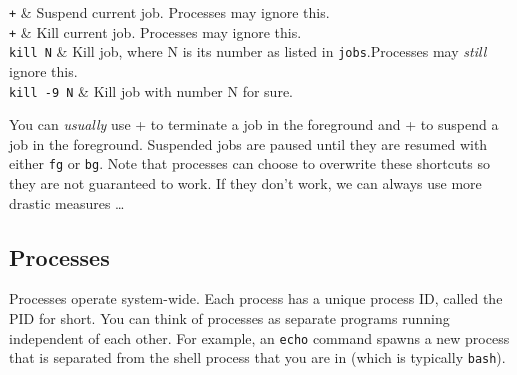\documentclass{TheAlternativeCourse}
\begin{document}
\begin{table}[H]
    \centering
    \begin{tcolorbox}[%
        enhanced,
        fuzzy shadow={1mm}{-1mm}{0mm}{0.1mm}{black!50!white},
        width=1.0\linewidth,
        tabularx={>{\centering\arraybackslash}l|>{\centering\arraybackslash}X},
        title={Controlling jobs}]
		\texttt{\keys{\ctrl}+} & Suspend current job. Processes may ignore this.\\
		\texttt{\keys{\ctrl}+} & Kill current job. Processes may ignore this.\\
        \texttt{kill N} & Kill job, where N is its number as listed in
        \texttt{jobs}.Processes may \emph{still} ignore this.\\
	    \texttt{kill -9 N} & Kill job with number N for sure.\\
    \end{tcolorbox}
    \label{tab8}
\end{table}

You can \emph{usually} use \keys{\ctrl}+ to terminate a job in the
foreground and \keys{\ctrl}+ to suspend a job in the foreground.
Suspended jobs are paused until they are resumed with either \texttt{fg} or
\texttt{bg}. Note that processes can choose to overwrite these shortcuts so
they are not guaranteed to work. If they don't work, we can always use more
drastic measures \ldots

\subsection{Processes}

Processes operate system-wide. Each process has a unique process ID, called the
PID for short. You can think of processes as separate programs running
independent of each other. For example, an \texttt{echo} command spawns a new
process that is separated from the shell process that you are in (which is
typically \texttt{bash}).
\end{document}
